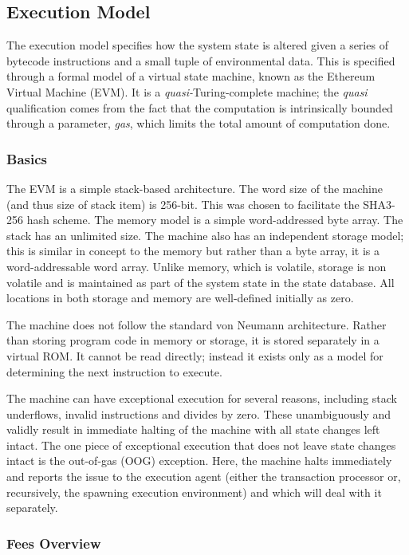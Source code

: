 \documentclass[9pt,oneside]{amsart}
\begin{document}
\begin{multicols}{2}
\subsection{Execution Model} \label{ch:model}

The execution model specifies how the system state is altered given a series of bytecode instructions and a small tuple of environmental data. This is specified through a formal model of a virtual state machine, known as the Ethereum Virtual Machine (EVM). It is a \textit{quasi-}Turing-complete machine; the \textit{quasi} qualification comes from the fact that the computation is intrinsically bounded through a parameter, \textit{gas}, which limits the total amount of computation done.

\subsubsection{Basics}

The EVM is a simple stack-based architecture. The word size of the machine (and thus size of stack item) is 256-bit. This was chosen to facilitate the SHA3-256 hash scheme. The memory model is a simple word-addressed byte array. The stack has an unlimited size. The machine also has an independent storage model; this is similar in concept to the memory but rather than a byte array, it is a word-addressable word array. Unlike memory, which is volatile, storage is non volatile and is maintained as part of the system state in the state database. All locations in both storage and memory are well-defined initially as zero.

The machine does not follow the standard von Neumann architecture. Rather than storing program code in memory or storage, it is stored separately in a virtual ROM. It cannot be read directly; instead it exists only as a model for determining the next instruction to execute.

The machine can have exceptional execution for several reasons, including stack underflows, invalid instructions and divides by zero. These unambiguously and validly result in immediate halting of the machine with all state changes left intact. The one piece of exceptional execution that does not leave state changes intact is the out-of-gas (OOG) exception. Here, the machine halts immediately and reports the issue to the execution agent (either the transaction processor or, recursively, the spawning execution environment) and which will deal with it separately.

\subsubsection{Fees Overview}


\end{multicols}
\end{document}
